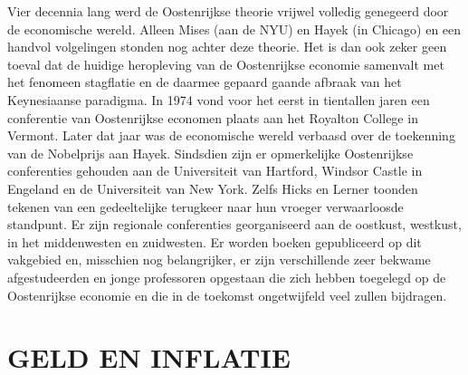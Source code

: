 \documentclass[
  a5paper,
  smalldemyvopaper,10pt,twoside,onecolumn,openright,extrafontsizes,hidelinks]{memoir}
\begin{document}
Vier decennia lang werd de Oostenrijkse theorie vrijwel volledig
genegeerd door de economische wereld. Alleen Mises (aan de NYU) en Hayek
(in Chicago) en een handvol volgelingen stonden nog achter deze theorie.
Het is dan ook zeker geen toeval dat de huidige heropleving van de
Oostenrijkse economie samenvalt met het fenomeen stagflatie en de
daarmee gepaard gaande afbraak van het Keynesiaanse paradigma. In 1974
vond voor het eerst in tientallen jaren een conferentie van Oostenrijkse
economen plaats aan het Royalton College in Vermont. Later dat jaar was
de economische wereld verbaasd over de toekenning van de Nobelprijs aan
Hayek. Sindsdien zijn er opmerkelijke Oostenrijkse conferenties gehouden
aan de Universiteit van Hartford, Windsor Castle in Engeland en de
Universiteit van New York. Zelfs Hicks en Lerner toonden tekenen van een
gedeeltelijke terugkeer naar hun vroeger verwaarloosde standpunt. Er
zijn regionale conferenties georganiseerd aan de oostkust, westkust, in
het middenwesten en zuidwesten. Er worden boeken gepubliceerd op dit
vakgebied en, misschien nog belangrijker, er zijn verschillende zeer
bekwame afgestudeerden en jonge professoren opgestaan die zich hebben
toegelegd op de Oostenrijkse economie en die in de toekomst ongetwijfeld
veel zullen bijdragen.

\section{\texorpdfstring{\textbf{GELD EN
INFLATIE}}{GELD EN INFLATIE}}\label{geld-en-inflatie}
\end{document}
